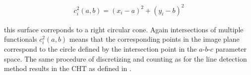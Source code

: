 \begin{align}
c_i^2(a, b) = (x_i-a)^2 + (y_i-b)^2
\end{align}

this surface correponds to a right circular cone. Again intersections of multiple functionals $c_i^2(a, b)$ means that the corresponding points in the image plane correspond to the circle defined by the intersection point in the $a$-$b$-$c$ parameter space. The same procedure of discretizing and counting as for the line detection method results in the CHT as defined in \cite{10.1145/361237.361242}.
